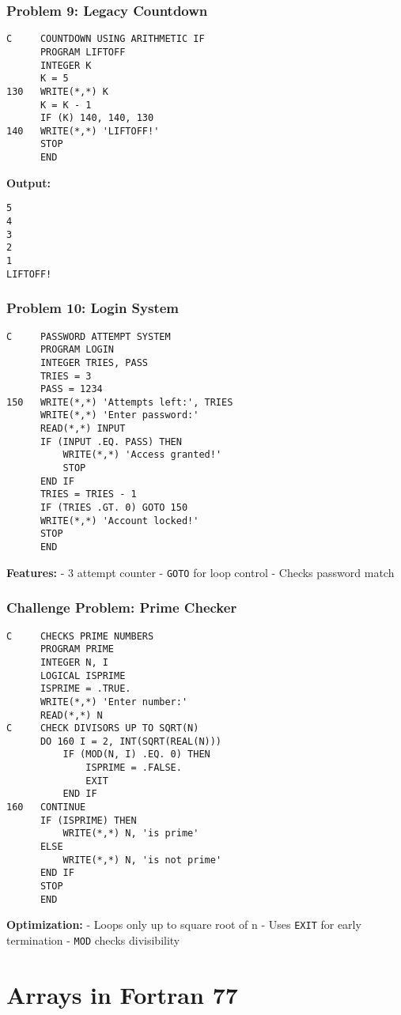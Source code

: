 \documentclass{book}
\begin{document}
\subsection*{Problem 9: Legacy Countdown}
\begin{verbatim}
C     COUNTDOWN USING ARITHMETIC IF
      PROGRAM LIFTOFF
      INTEGER K
      K = 5
130   WRITE(*,*) K
      K = K - 1
      IF (K) 140, 140, 130
140   WRITE(*,*) 'LIFTOFF!'
      STOP
      END
\end{verbatim}
\textbf{Output:}
\begin{verbatim}
5
4
3
2
1
LIFTOFF!
\end{verbatim}

\subsection*{Problem 10: Login System}
\begin{verbatim}
C     PASSWORD ATTEMPT SYSTEM
      PROGRAM LOGIN
      INTEGER TRIES, PASS
      TRIES = 3
      PASS = 1234
150   WRITE(*,*) 'Attempts left:', TRIES
      WRITE(*,*) 'Enter password:'
      READ(*,*) INPUT
      IF (INPUT .EQ. PASS) THEN
          WRITE(*,*) 'Access granted!'
          STOP
      END IF
      TRIES = TRIES - 1
      IF (TRIES .GT. 0) GOTO 150
      WRITE(*,*) 'Account locked!'
      STOP
      END
\end{verbatim}
\textbf{Features:}
- 3 attempt counter
- \texttt{GOTO} for loop control
- Checks password match

\subsection{Challenge Problem: Prime Checker}
\begin{verbatim}
C     CHECKS PRIME NUMBERS
      PROGRAM PRIME
      INTEGER N, I
      LOGICAL ISPRIME
      ISPRIME = .TRUE.
      WRITE(*,*) 'Enter number:'
      READ(*,*) N
C     CHECK DIVISORS UP TO SQRT(N)
      DO 160 I = 2, INT(SQRT(REAL(N)))
          IF (MOD(N, I) .EQ. 0) THEN
              ISPRIME = .FALSE.
              EXIT
          END IF
160   CONTINUE
      IF (ISPRIME) THEN
          WRITE(*,*) N, 'is prime'
      ELSE
          WRITE(*,*) N, 'is not prime'
      END IF
      STOP
      END
\end{verbatim}
\textbf{Optimization:}
- Loops only up to square root of n
- Uses \texttt{EXIT} for early termination
- \texttt{MOD} checks divisibility

\chapter{Arrays in Fortran 77}
\end{document}
